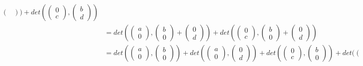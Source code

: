 \begin{example}
\begin{align*}
\begin{pmatrix}
    \end{pmatrix})+det(\begin{pmatrix}
        0 \\ c
    \end{pmatrix}, \begin{pmatrix}
        b \\ d
    \end{pmatrix})\tag{by Multilinearity}\\
    &=det(\begin{pmatrix}
        a \\ 0
    \end{pmatrix}, \begin{pmatrix}
        b \\ 0
    \end{pmatrix}+\begin{pmatrix}
        0 \\ d
    \end{pmatrix})+det(\begin{pmatrix}
        0 \\ c
    \end{pmatrix}, \begin{pmatrix}
        b \\ 0
    \end{pmatrix}+\begin{pmatrix}
        0 \\ d
    \end{pmatrix})\\
    &=det(\begin{pmatrix}
        a \\ 0
    \end{pmatrix}, \begin{pmatrix}
        b \\ 0
    \end{pmatrix})+det(\begin{pmatrix}
        a \\ 0
    \end{pmatrix}, \begin{pmatrix}
        0 \\ d
    \end{pmatrix})+det(\begin{pmatrix}
        0 \\ c
    \end{pmatrix}, \begin{pmatrix}
        b \\ 0
    \end{pmatrix})+det(\begin{pmatrix}

\end{pmatrix}
\end{align*}
\end{example}
